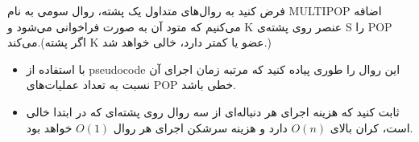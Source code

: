 فرض کنید به روال‌های متداول یک پشته، روال سومی به نام MULTIPOP اضافه می‌کنیم که متود آن به صورت  فراخوانی می‌شود و K عنصر روی پشته‌ی S را POP می‌کند.(اگر پشته K عضو یا کمتر دارد، خالی خواهد شد.)
\begin{itemize}
\item با استفاده از pseudocode این روال را طوری پیاده کنید که مرتبه زمان اجرای آن نسبت به تعداد عملیات‌های POP خطی باشد. 
\item ثابت کنید که هزینه اجرای هر دنباله‌ای از سه روال  روی پشته‌ای که در ابتدا خالی است، کران بالای $O(n)$ دارد و هزینه سرشکن اجرای هر روال $O(1)$ خواهد بود.
\end{itemize}